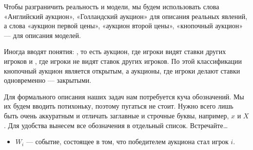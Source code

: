 Чтобы разграничить реальность и модели, мы будем использовать слова «Английский аукцион», «Голландский аукцион» для описания реальных явлений, а слова «аукцион первой цены», «аукцион второй цены», «кнопочный аукцион» — для описания моделей.

Иногда вводят понятия: , то есть аукцион, где игроки видят ставки других игроков и , где игроки не видят ставок других игроков. По этой классификации кнопочный аукцион является открытым, а аукционы, где игроки делают ставки одновременно — закрытыми.

Для формального описания наших задач нам потребуется куча обозначений. Мы их будем вводить потихоньку, поэтому пугаться не стоит. Нужно всего лишь быть очень аккуратным и отличать заглавные и строчные буквы, например, $x$ и $X$.
Для удобства вынесем все обозначения в отдельный список. Встречайте\ldots

\newpage

\begin{center}
\end{center}

\begin{itemize}
\item $W_{i}$ — событие, состоящее в том, что победителем аукциона стал игрок $ i $.
\end{itemize}


